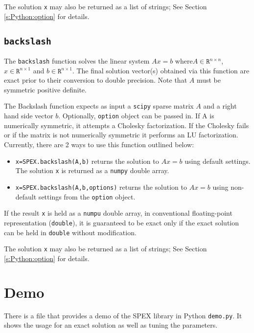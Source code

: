 \documentclass[12pt]{report}
\theoremstyle{definition}
\begin{document}
The solution \verb|x| may also be returned as a list of strings; See Section \ref{s:Python:option} for details.

\subsection{\texttt{backslash}}

The \verb|backslash| function solves the linear system $Ax=b$ where$A \in \mathtt{R}^{n \times n}$, $x \in \mathtt{R}^{n \times 1}$ and $b \in \mathtt{R}^{n \times 1}$. The final solution vector(s) obtained via this function are exact prior to their conversion to double precision. Note that $A$ must be symmetric positive definite.

The Backslash function expects as input a \verb|scipy| sparse matrix $A$ and a right hand side vector $b$. Optionally, \verb|option| object can be passed in. If A is numerically symmetric, it attempts a Cholesky factorization. If the Cholesky fails or if the matrix is not numerically symmetric it performs an LU factorization.
Currently, there are 2 ways to use this function outlined below:

\begin{itemize}
    \item \verb|x=SPEX.backslash(A,b)| returns the solution to $A x = b$ using default settings. The solution \verb|x| is returned as a \verb|numpy| double array.
    \item \verb|x=SPEX.backslash(A,b,options)| returns the solution to $A x = b$ using non-default settings from the \verb|option| object.
\end{itemize}

If the result \verb|x| is held as a \verb|numpu| double array, in conventional floating-point representation (\verb|double|), it is guaranteed to be exact only if the exact solution can be held in \verb|double| without modification.

The solution \verb|x| may also be returned as a list of strings; See Section \ref{s:Python:option} for details.


\section{Demo}

There is a file that provides a demo of the SPEX library in Python \verb|demo.py|. It shows the usage for an exact
solution as well as tuning the parameters.








\end{document}
